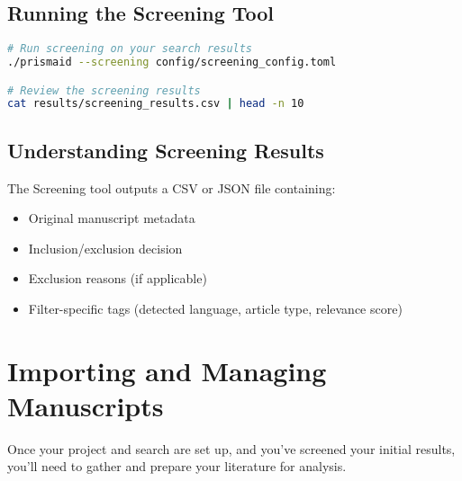\subsection{Running the Screening Tool}

\begin{commandbox}
\begin{lstlisting}[language=Bash]
# Run screening on your search results
./prismaid --screening config/screening_config.toml

# Review the screening results
cat results/screening_results.csv | head -n 10
\end{lstlisting}
\end{commandbox}



\subsection{Understanding Screening Results}

The Screening tool outputs a CSV or JSON file containing:
\begin{itemize}
    \item Original manuscript metadata
    \item Inclusion/exclusion decision
    \item Exclusion reasons (if applicable)
    \item Filter-specific tags (detected language, article type, relevance score)
\end{itemize}


\section{Importing and Managing Manuscripts}

Once your project and search are set up, and you've screened your initial results, you'll need to gather and prepare your literature for analysis.

